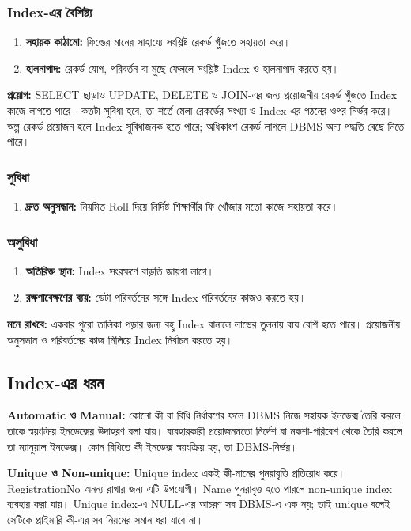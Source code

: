 \subsubsection{Index-এর বৈশিষ্ট্য}
\begin{enumerate}
\item \textbf{সহায়ক কাঠামো:} ফিল্ডের মানের সাহায্যে সংশ্লিষ্ট রেকর্ড খুঁজতে সহায়তা করে।
\item \textbf{হালনাগাদ:} রেকর্ড যোগ, পরিবর্তন বা মুছে ফেললে সংশ্লিষ্ট Index-ও হালনাগাদ করতে হয়।
\end{enumerate}
\textbf{প্রয়োগ:} SELECT ছাড়াও UPDATE, DELETE ও JOIN-এর জন্য প্রয়োজনীয় রেকর্ড খুঁজতে Index কাজে লাগতে পারে। কতটা সুবিধা হবে, তা শর্তে মেলা রেকর্ডের সংখ্যা ও Index-এর গঠনের ওপর নির্ভর করে। অল্প রেকর্ড প্রয়োজন হলে Index সুবিধাজনক হতে পারে; অধিকাংশ রেকর্ড লাগলে DBMS অন্য পদ্ধতি বেছে নিতে পারে।
\subsubsection{সুবিধা}
\begin{enumerate}
\item \textbf{দ্রুত অনুসন্ধান:} নিয়মিত Roll দিয়ে নির্দিষ্ট শিক্ষার্থীর ফি খোঁজার মতো কাজে সহায়তা করে।
\end{enumerate}
\subsubsection{অসুবিধা}
\begin{enumerate}
\item \textbf{অতিরিক্ত স্থান:} Index সংরক্ষণে বাড়তি জায়গা লাগে।
\item \textbf{রক্ষণাবেক্ষণের ব্যয়:} ডেটা পরিবর্তনের সঙ্গে Index পরিবর্তনের কাজও করতে হয়।
\end{enumerate}
\textbf{মনে রাখবে:} একবার পুরো তালিকা পড়ার জন্য বহু Index বানালে লাভের তুলনায় ব্যয় বেশি হতে পারে। প্রয়োজনীয় অনুসন্ধান ও পরিবর্তনের কাজ মিলিয়ে Index নির্বাচন করতে হয়।

\subsection{Index-এর ধরন}
\textbf{Automatic ও Manual:} কোনো কী বা বিধি নির্ধারণের ফলে DBMS নিজে সহায়ক ইনডেক্স তৈরি করলে তাকে স্বয়ংক্রিয় ইনডেক্সের উদাহরণ বলা যায়। ব্যবহারকারী প্রয়োজনমতো নির্দেশ বা নকশা-পরিবেশ থেকে তৈরি করলে তা ম্যানুয়াল ইনডেক্স। কোন বিধিতে কী ইনডেক্স স্বয়ংক্রিয় হয়, তা DBMS-নির্ভর।

\textbf{Unique ও Non-unique:} Unique index একই কী-মানের পুনরাবৃত্তি প্রতিরোধ করে। RegistrationNo অনন্য রাখার জন্য এটি উপযোগী। Name পুনরাবৃত্ত হতে পারলে non-unique index ব্যবহার করা যায়। Unique index-এ NULL-এর আচরণ সব DBMS-এ এক নয়; তাই unique বলেই সেটিকে প্রাইমারি কী-এর সব নিয়মের সমান ধরা যাবে না।

